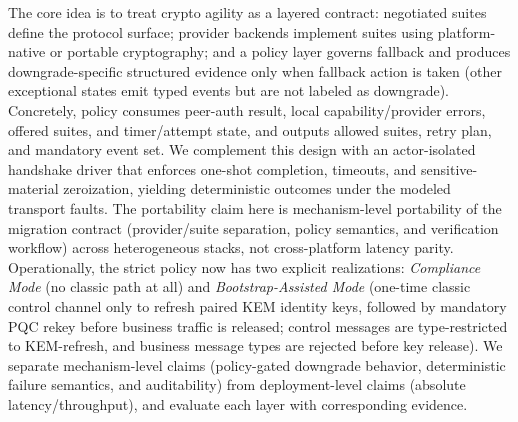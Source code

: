 \documentclass[10pt,journal,compsoc]{IEEEtran}
\begin{document}
The core
idea is to treat crypto agility as a layered
contract: negotiated suites define the protocol surface; provider
backends implement suites using platform-native or portable
cryptography; and a policy layer governs fallback and produces
downgrade-specific structured evidence only when fallback action is
taken (other exceptional states emit typed events but are not labeled
as downgrade). Concretely, policy consumes peer-auth result, local
capability/provider errors, offered suites, and timer/attempt state, and
outputs allowed suites, retry plan, and mandatory event set. We
complement
this design with an actor-isolated handshake driver that enforces
one-shot completion, timeouts, and sensitive-material zeroization,
yielding deterministic outcomes under the modeled transport faults.
The portability claim here is mechanism-level portability of the
migration contract (provider/suite separation, policy semantics, and
verification workflow) across heterogeneous stacks, not cross-platform
latency parity.
Operationally, the strict policy now has two explicit realizations:
\emph{Compliance Mode} (no classic path at all) and
\emph{Bootstrap-Assisted Mode} (one-time classic control channel only to
refresh paired KEM identity keys, followed by mandatory PQC rekey before
business traffic is released; control messages are type-restricted to
KEM-refresh, and business message types are rejected before key
release).
We separate mechanism-level claims (policy-gated downgrade behavior,
deterministic failure semantics, and auditability) from deployment-level
claims (absolute latency/throughput), and evaluate each layer with
corresponding evidence.
\end{document}
